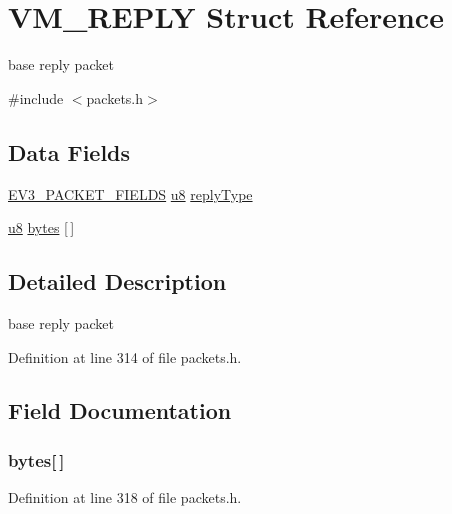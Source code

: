 \hypertarget{struct_v_m___r_e_p_l_y}{}\section{V\+M\+\_\+\+R\+E\+P\+L\+Y Struct Reference}
\label{struct_v_m___r_e_p_l_y}


base reply packet  




{\ttfamily \#include $<$packets.\+h$>$}

\subsection*{Data Fields}
\begin{DoxyCompactItemize}
\item 
\hyperlink{packets_8h_a948b7811b250da5bc1297c8d0c4c698b}{E\+V3\+\_\+\+P\+A\+C\+K\+E\+T\+\_\+\+F\+I\+E\+L\+D\+S} \hyperlink{defs_8h_a92c50087ca0e64fa93fc59402c55f8ca}{u8} \hyperlink{struct_v_m___r_e_p_l_y_a22d54946f3de285a0602996eeab97bb2}{reply\+Type}
\item 
\hyperlink{defs_8h_a92c50087ca0e64fa93fc59402c55f8ca}{u8} \hyperlink{struct_v_m___r_e_p_l_y_a1fdde1580342b6b1df0d8f5213c45107}{bytes} \mbox{[}$\,$\mbox{]}
\end{DoxyCompactItemize}


\subsection{Detailed Description}
base reply packet 

Definition at line 314 of file packets.\+h.



\subsection{Field Documentation}
\hypertarget{struct_v_m___r_e_p_l_y_a1fdde1580342b6b1df0d8f5213c45107}{}
\subsubsection[{bytes}]{ bytes\mbox{[}$\,$\mbox{]}}\label{struct_v_m___r_e_p_l_y_a1fdde1580342b6b1df0d8f5213c45107}


Definition at line 318 of file packets.\+h.

